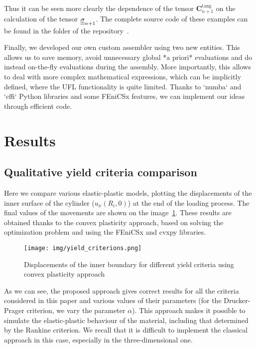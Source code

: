 \documentclass[12pt]{article}
\begin{document}
Thus it can be seen more clearly the dependence of the tensor $\mathbf{C}^\text{tang}_{n+1}$ on the calculation of the tensor $\underline{\underline{\sigma}}_{n+1}$. The complete source code of these examples can be found in the  folder of the repository~\parencite{convex-plasticity}.

Finally, we developed our own custom assembler using two new entities. This allows us to save memory, avoid unnecessary global *a priori* evaluations and do instead on-the-fly evaluations during the assembly. More importantly, this allows to deal with more complex mathematical expressions, which can be implicitly defined, where the UFL functionality is quite limited. Thanks to `numba` and `cffi` Python libraries and some FEniCSx features, we can implement our ideas through efficient code. 

\newpage
\section{Results}
\label{sec:results}

\subsection{Qualitative yield criteria comparison}

Here we compare various elastic-plastic models, plotting the displacements of the inner surface of the cylinder ($u_x(R_i, 0)$) at the end of the loading process. The final values of the movements are shown on the image~\ref{fig:yield_criteria}. These results are obtained thanks to the convex plasticity approach, based on solving the optimization problem and using the FEniCSx and cvxpy libraries.
\begin{figure}[H]
    \center
    \texttt{[image: img/yield\_criterions.png]}
    \caption{Displacements of the inner boundary for different yield criteria using convex plasticity approach}
    \label{fig:yield_criteria}
\end{figure}
As we can see, the proposed approach gives correct results for all the criteria considered in this paper and various values of their parameters (for the Drucker-Prager criterion, we vary the parameter $\alpha$). This approach makes it possible to simulate the elastic-plastic behaviour of the material, including that determined by the Rankine criterion. We recall that it is difficult to implement the classical approach in this case, especially in the three-dimensional one.
\end{document}
